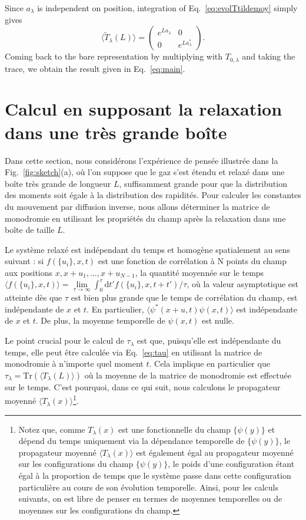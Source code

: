 \documentclass[submission,Phys,10pt]{SciPost}%
\begin{document}
Since $a_\lambda$ is independent on position, integration  of Eq.~\eqref{eq:evolTtildemoy} simply gives
\begin{equation}
    \langle \tilde{T}_\lambda(L)\rangle =\begin{pmatrix}e^{L a_\lambda }& 0\\ 0 & e^{L a_\lambda^* }\end{pmatrix}.
\end{equation}
Coming back to the bare representation by multiplying  with
 $T_{0,\lambda}$ and taking the trace,  
we  
obtain the result given in Eq.~\eqref{eq:main}.

{\color{blue}
\section*{Calcul en supposant la relaxation dans une très grande boîte}
\label{sec:markov}
Dans cette section, nous considérons l'expérience de pensée illustrée dans la Fig.~\ref{fig:sketch}(a), où l'on suppose que le gaz s'est étendu et relaxé dans une boîte très grande de longueur $L$, suffisamment grande pour que la distribution des moments soit égale à la distribution des rapidités. 
Pour calculer les constantes du mouvement par diffusion inverse, nous allons déterminer la matrice de monodromie en utilisant les propriétés du champ après la relaxation dans une boîte de taille $L$.

Le système relaxé est indépendant du temps et homogène spatialement au sens suivant : si $f(\{u_i\},x,t)$ est une fonction de corrélation à N points du champ aux positions $x,x+u_1,\dots,x+u_{N-1}$, la quantité moyennée sur le temps 
$\langle f(\{u_i\},x,t)\rangle=\underset{\tau\rightarrow\infty}{\lim} \int_0^\tau \mathrm{d}t' f(\{u_i\},x,t+t') / \tau$, où la valeur asymptotique est atteinte dès que $\tau$ est bien plus grande que le temps de corrélation du champ, est indépendante de $x$ et $t$. En particulier, $\langle \psi^*(x+u,t)\psi(x,t)\rangle$ est indépendante de $x$ et $t$. De plus, la moyenne temporelle de $\psi(x,t)$ est nulle.

Le point crucial pour le calcul de $\tau_\lambda$ est que, puisqu'elle est indépendante du temps, elle peut être calculée via Eq.~\eqref{eq:tau} en utilisant la matrice de monodromie à n'importe quel moment $t$. Cela implique en particulier que $\tau_\lambda=\mathrm{Tr}(\langle T_\lambda(L)\rangle)$ où la moyenne de la matrice de monodromie est effectuée sur le temps. C'est pourquoi, dans ce qui suit, nous calculons le propagateur moyenné $\langle T_\lambda(x)\rangle$\footnote{
Notez que, comme $T_\lambda(x)$ est une fonctionnelle du champ $\{\psi(y)\}$ et dépend du temps uniquement via la dépendance temporelle de $\{\psi(y)\}$, le propagateur moyenné $\langle T_\lambda(x)\rangle$ est également égal au propagateur moyenné sur les configurations du champ $\{\psi(y)\}$, le poids d'une configuration étant égal à la proportion de temps que le système passe dans cette configuration particulière au cours de son évolution temporelle. Ainsi, pour les calculs suivants, on est libre de penser en termes de moyennes temporelles ou de moyennes sur les configurations du champ.}.

}
\end{document}
